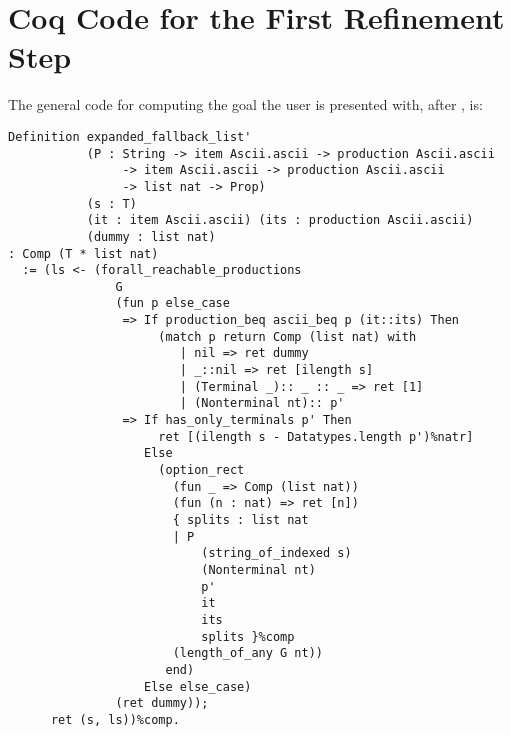    \section{Coq Code for the First Refinement Step} \label{sec:expanded-fallback-list}
       The general code for computing the goal the user is presented with, after , is:
\begin{verbatim}
Definition expanded_fallback_list'
           (P : String -> item Ascii.ascii -> production Ascii.ascii
                -> item Ascii.ascii -> production Ascii.ascii
                -> list nat -> Prop)
           (s : T)
           (it : item Ascii.ascii) (its : production Ascii.ascii)
           (dummy : list nat)
: Comp (T * list nat)
  := (ls <- (forall_reachable_productions
               G
               (fun p else_case
                => If production_beq ascii_beq p (it::its) Then
                     (match p return Comp (list nat) with
                        | nil => ret dummy
                        | _::nil => ret [ilength s]
                        | (Terminal _):: _ :: _ => ret [1]
                        | (Nonterminal nt):: p'
                => If has_only_terminals p' Then
                     ret [(ilength s - Datatypes.length p')%natr]
                   Else
                     (option_rect
                       (fun _ => Comp (list nat))
                       (fun (n : nat) => ret [n])
                       { splits : list nat
                       | P
                           (string_of_indexed s)
                           (Nonterminal nt)
                           p'
                           it
                           its
                           splits }%comp
                       (length_of_any G nt))
                      end)
                   Else else_case)
               (ret dummy));
      ret (s, ls))%comp.
\end{verbatim}
